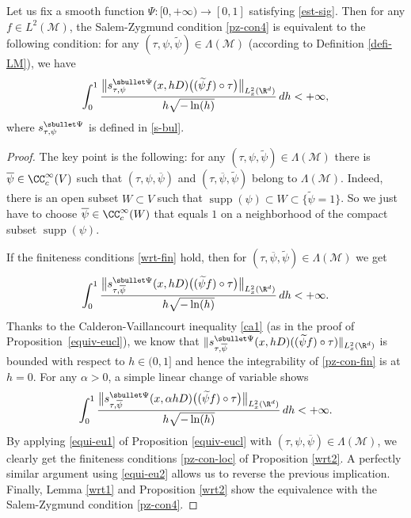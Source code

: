 \begin{prop}
Let us fix a smooth function $\Psi:[0,+\infty)\to [0,1]$ satisfying \eqref{est-sig}.
Then for any $f\in L^2(\mathcal{M})$, the Salem-Zygmund condition \eqref{pz-con4} is equivalent to the following condition: for any $(\tau,\psi,\widetilde{\psi})\in \Lambda(\mathcal{M})$ (according to Definition \ref{defi-LM}), we have
\begin{equation}\label{wrt-fin}
\int_{0}^1 \frac{\bigl\|s_{\tau,\psi}^{\sbullet\Psi}(x,hD)\bigl((\widetilde{\psi}f)\circ \tau \bigr) \bigr\|_{L_x^2(\R^d)}}{h\sqrt{-\ln(h)}} \,dh <+\infty,
\end{equation}
where $s_{\tau,\psi}^{\sbullet\Psi}$ is defined in \eqref{s-bul}.
\end{prop}
\begin{proof}
The key point is the following: for any $(\tau,\psi,\widetilde{\psi})\in \Lambda(\mathcal{M})$ there is $\overline{\psi}\in \CC_c^\infty(V)$ such that $(\tau,\psi,\overline{\psi})$ and $(\tau,\overline{\psi},\widetilde{\psi})$ belong to $\Lambda(\mathcal{M})$.
Indeed, there is an open subset $W\subset V$ such that $\operatorname{supp}(\psi)\subset W\subset \{\widetilde{\psi}=1\}$. So we just have to choose $\overline{\psi}\in \CC_c^\infty(W)$
that equals $1$ on a neighborhood of the compact subset $\operatorname{supp}(\psi)$.

If the finiteness conditions \eqref{wrt-fin} hold, then for $(\tau,\overline{\psi},\widetilde{\psi})\in \Lambda(\mathcal{M})$ we get
\begin{equation}\label{pz-con-fin}
\int_{0}^1 \frac{\bigl\|s_{\tau,\overline{\psi}}^{\sbullet\Psi}(x,hD)\bigl((\widetilde{\psi}f)\circ \tau \bigr) \bigr\|_{L_x^2(\R^d)}}{h\sqrt{-\ln(h)}} \,dh<+\infty.
\end{equation}
Thanks to the Calderon-Vaillancourt inequality \eqref{ca1} (as in the proof of Proposition~\ref{equiv-eucl}), we know that $\|s_{\tau,\overline{\psi}}^{\sbullet\Psi}(x, hD)((\widetilde{\psi}f)\circ \tau) \|_{L_x^2(\R^d)}$ is bounded with respect to $h\in (0,1]$ and hence the integrability of \eqref{pz-con-fin} is at $h=0$. For any $\alpha>0$, a simple linear change of variable shows
\begin{equation*}
\int_{0}^1 \frac{\bigl\|s_{\tau,\overline{\psi}}^{\sbullet\Psi}(x,\alpha hD)\bigl((\widetilde{\psi}f)\circ \tau \bigr) \bigr\|_{L_x^2(\R^d)}}{h\sqrt{-\ln(h)}} \,dh<+\infty.
\end{equation*}
By applying \eqref{equi-eu1} of Proposition \ref{equiv-eucl} with $(\tau,\psi,\overline{\psi})\in \Lambda(\mathcal{M})$, we clearly get
the finiteness conditions \eqref{pz-con-loc} of Proposition \ref{wrt2}.
A perfectly similar argument using \eqref{equi-eu2} allows us to reverse the previous implication.
Finally, Lemma \ref{wrt1} and Proposition \ref{wrt2} show the equivalence with the Salem-Zygmund condition
\eqref{pz-con4}.
\end{proof}

